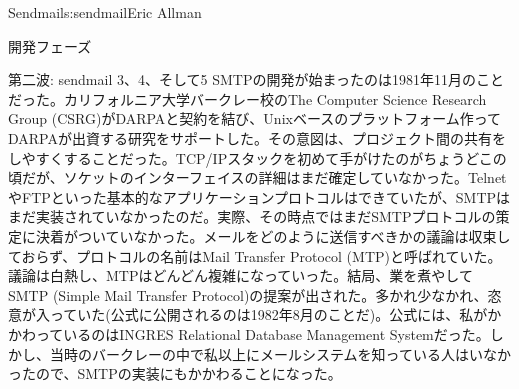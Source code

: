 \begin{aosachapter}{Sendmail}{s:sendmail}{Eric Allman}
\begin{aosasect1}{開発フェーズ}
\begin{aosasect2}{第二波: sendmail 3、4、そして5}
SMTPの開発が始まったのは1981年11月のことだった。カリフォルニア大学バークレー校のThe Computer Science Research Group (CSRG)がDARPAと契約を結び、Unixベースのプラットフォーム作ってDARPAが出資する研究をサポートした。その意図は、プロジェクト間の共有をしやすくすることだった。TCP/IPスタックを初めて手がけたのがちょうどこの頃だが、ソケットのインターフェイスの詳細はまだ確定していなかった。TelnetやFTPといった基本的なアプリケーションプロトコルはできていたが、SMTPはまだ実装されていなかったのだ。実際、その時点ではまだSMTPプロトコルの策定に決着がついていなかった。メールをどのように送信すべきかの議論は収束しておらず、プロトコルの名前はMail Transfer Protocol (MTP)と呼ばれていた。議論は白熱し、MTPはどんどん複雑になっていった。結局、業を煮やしてSMTP (Simple Mail Transfer Protocol)の提案が出された。多かれ少なかれ、恣意が入っていた(公式に公開されるのは1982年8月のことだ)。公式には、私がかかわっているのはINGRES Relational Database Management Systemだった。しかし、当時のバークレーの中で私以上にメールシステムを知っている人はいなかったので、SMTPの実装にもかかわることになった。


\end{aosasect2}
\end{aosasect1}
\end{aosachapter}
